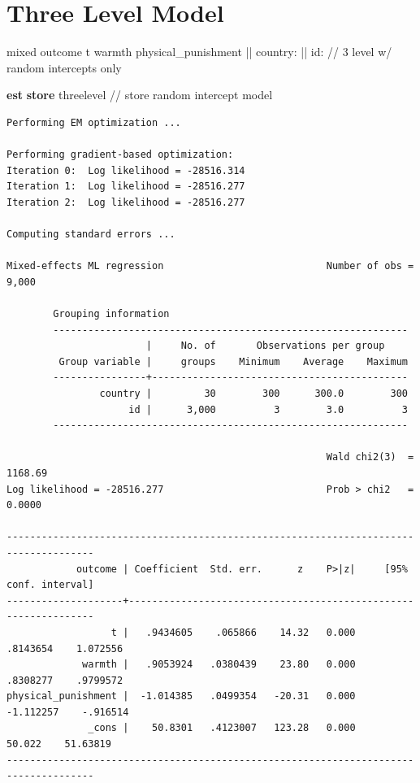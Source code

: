 \documentclass[
  letterpaper,
  DIV=11,
  numbers=noendperiod]{scrreprt}
\newenvironment{Shaded}{\begin{snugshade}}{\end{snugshade}}
\newcommand{\CommentTok}[1]{\textcolor[rgb]{0.37,0.37,0.37}{#1}}
\newcommand{\KeywordTok}[1]{\textcolor[rgb]{0.00,0.23,0.31}{\textbf{#1}}}
\newcommand{\NormalTok}[1]{\textcolor[rgb]{0.00,0.23,0.31}{#1}}
\begin{document}
\section{Three Level Model}\label{three-level-model}

\begin{Shaded}
\begin{Highlighting}[]

\NormalTok{mixed outcome t warmth physical\_punishment || country: || id:  }\CommentTok{// 3 level w/ random intercepts only}
    
\KeywordTok{est} \KeywordTok{store}\NormalTok{ threelevel }\CommentTok{// store random intercept model}
\end{Highlighting}
\end{Shaded}

\begin{verbatim}
Performing EM optimization ...

Performing gradient-based optimization: 
Iteration 0:  Log likelihood = -28516.314  
Iteration 1:  Log likelihood = -28516.277  
Iteration 2:  Log likelihood = -28516.277  

Computing standard errors ...

Mixed-effects ML regression                            Number of obs =   9,000

        Grouping information
        -------------------------------------------------------------
                        |     No. of       Observations per group
         Group variable |     groups    Minimum    Average    Maximum
        ----------------+--------------------------------------------
                country |         30        300      300.0        300
                     id |      3,000          3        3.0          3
        -------------------------------------------------------------

                                                       Wald chi2(3)  = 1168.69
Log likelihood = -28516.277                            Prob > chi2   =  0.0000

-------------------------------------------------------------------------------------
            outcome | Coefficient  Std. err.      z    P>|z|     [95% conf. interval]
--------------------+----------------------------------------------------------------
                  t |   .9434605    .065866    14.32   0.000     .8143654    1.072556
             warmth |   .9053924   .0380439    23.80   0.000     .8308277    .9799572
physical_punishment |  -1.014385   .0499354   -20.31   0.000    -1.112257    -.916514
              _cons |    50.8301   .4123007   123.28   0.000       50.022    51.63819
-------------------------------------------------------------------------------------


\end{verbatim}
\end{document}

